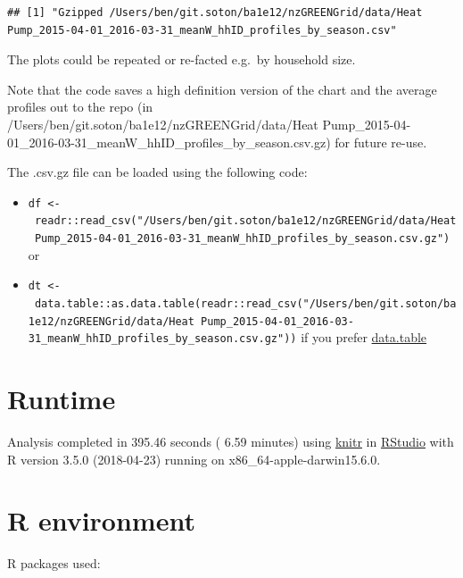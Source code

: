 \documentclass[]{article}
\providecommand{\tightlist}{%
  \setlength{\itemsep}{0pt}\setlength{\parskip}{0pt}}
\begin{document}
\begin{verbatim}
## [1] "Gzipped /Users/ben/git.soton/ba1e12/nzGREENGrid/data/Heat Pump_2015-04-01_2016-03-31_meanW_hhID_profiles_by_season.csv"
\end{verbatim}

The plots could be repeated or re-facted e.g.~by household size.

Note that the code saves a high definition version of the chart and the
average profiles out to the repo (in
/Users/ben/git.soton/ba1e12/nzGREENGrid/data/Heat
Pump\_2015-04-01\_2016-03-31\_meanW\_hhID\_profiles\_by\_season.csv.gz)
for future re-use.

The .csv.gz file can be loaded using the following code:

\begin{itemize}
\tightlist
\item
  \texttt{df\ \textless{}-\ readr::read\_csv("/Users/ben/git.soton/ba1e12/nzGREENGrid/data/Heat\ Pump\_2015-04-01\_2016-03-31\_meanW\_hhID\_profiles\_by\_season.csv.gz")}
  or
\item
  \texttt{dt\ \textless{}-\ data.table::as.data.table(readr::read\_csv("/Users/ben/git.soton/ba1e12/nzGREENGrid/data/Heat\ Pump\_2015-04-01\_2016-03-31\_meanW\_hhID\_profiles\_by\_season.csv.gz"))}
  if you prefer \href{}{data.table}
\end{itemize}

\section{Runtime}\label{runtime}

Analysis completed in 395.46 seconds ( 6.59 minutes) using
\href{https://cran.r-project.org/package=knitr}{knitr} in
\href{http://www.rstudio.com}{RStudio} with R version 3.5.0 (2018-04-23)
running on x86\_64-apple-darwin15.6.0.

\section{R environment}\label{r-environment}

R packages used:
\end{document}
